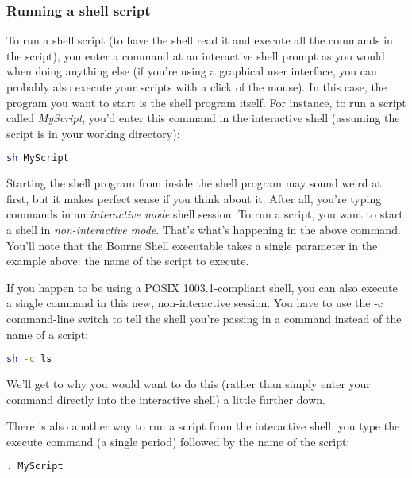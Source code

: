 \subsubsection{Running a shell script}
To run a shell script (to have the shell read it and execute all the commands
in the script), you enter a command at an interactive shell prompt as you would
when doing anything else (if you're using a graphical user interface, you can
probably also execute your scripts with a click of the mouse). In this case,
the program you want to start is the shell program itself. For instance, to run
a script called \textit{MyScript}, you'd enter this command in the interactive
shell (assuming the script is in your working directory):
\lstset{basicstyle=\scriptsize, numbers=left, captionpos=b, tabsize=4}
\begin{lstlisting}[caption=Running a script,language={bash},
xleftmargin=15pt, label=lst:Running a script]
sh MyScript
\end{lstlisting}

Starting the shell program from inside the shell program may sound weird at
first,  but it makes perfect sense if you think about it. After all, you're
typing commands in an \textit{interactive mode} shell session. To run a script,
you want to start a shell in \textit{non-interactive mode}. That's what's
happening in the above command. You'll note that the Bourne Shell executable
takes a single parameter in the example above: the name of the script to
execute.

If you happen to be using a POSIX 1003.1-compliant shell, you can also execute
a single command in this new, non-interactive session. You have to use the -c
command-line switch to tell the shell you're passing in a command instead of
the name of a script:
\lstset{basicstyle=\scriptsize, numbers=left, captionpos=b, tabsize=4}
\begin{lstlisting}[caption=Running a command in a new shell,language={bash},
xleftmargin=15pt, label=lst:Running a command in a new shell]
sh -c ls
\end{lstlisting}

We'll get to why you would want to do this (rather than simply enter your
command directly into the interactive shell) a little further down.

There is also another way to run a script from the interactive shell: you type
the execute command (a single period) followed  by the name of the script:
\lstset{basicstyle=\scriptsize, numbers=left, captionpos=b, tabsize=4}
\begin{lstlisting}[caption=Sourcing a script,language={bash},
xleftmargin=15pt, label=lst:Sourcing a script]
. MyScript
\end{lstlisting}

